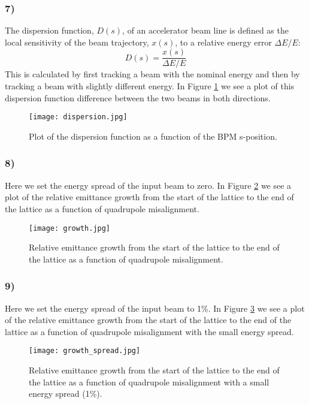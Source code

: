 \documentclass[12pt,a4paper,english]{article}
\begin{document}
\subsubsection*{7)}
The dispersion function, $D(s)$, of an accelerator beam line is defined as the local sensitivity of the beam trajectory, $x(s)$, to a relative energy error $\Delta E/E$:
\begin{equation}
D(s)=\frac{x(s)}{\Delta E/E}
\end{equation}
This is calculated by first tracking a beam with the nominal energy and then by tracking a beam with slightly different energy. In Figure \ref{fig:dispersion} we see a plot of this dispersion function difference between the two beams in both directions.

\begin{figure}[htbp!]
	\centering\texttt{[image: dispersion.jpg]}
	\caption{Plot of the dispersion function as a function of the BPM s-position. \label{fig:dispersion}}
\end{figure} 

\subsubsection*{8)}
Here we set the energy spread of the input beam to zero. In Figure \ref{fig:em_growth} we see a plot of the relative emittance growth from the start of the lattice to the end of the lattice as a function of quadrupole misalignment.

\begin{figure}[htbp!]
	\centering\texttt{[image: growth.jpg]}
	\caption{Relative emittance growth from the start of the lattice to the end of the lattice as a function of quadrupole misalignment. \label{fig:em_growth}}
\end{figure} 

\subsubsection*{9)}
Here we set the energy spread of the input beam to 1\%. In Figure \ref{fig:em_growth_spread} we see a plot of the relative emittance growth from the start of the lattice to the end of the lattice as a function of quadrupole misalignment with the small energy spread.

\begin{figure}[htbp!]
	\centering\texttt{[image: growth\_spread.jpg]}
	\caption{Relative emittance growth from the start of the lattice to the end of the lattice as a function of quadrupole misalignment with a small energy spread (1\%). \label{fig:em_growth_spread}}
\end{figure} 
\end{document}
